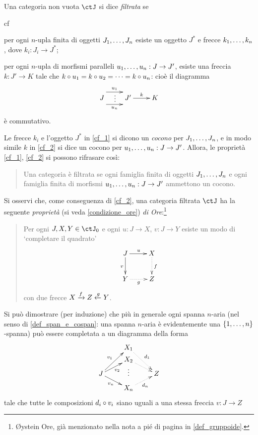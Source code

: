 \begin{definition}\label{def_cat_filtrata}
	Una categoria non vuota \(\ctJ\) si dice \emph{filtrata} se
	\begin{enumtag}{cf}
		\item \label{cf_1} per ogni \(n\)-upla finita di oggetti \(\tup Jn,\) esiste un oggetto \(J^*\) e frecce \(\tup kn,\), dove \(k_i : J_i\to J^*\);
		\item \label{cf_2} per ogni \(n\)-upla di morfismi paralleli \(\tup un, : J\to J'\), esiste una freccia \(k : J'\to K\) tale che \(k\circ u_1 = k\circ u_2 = \dots = k \circ u_n\): cioè il diagramma
		\[\xymatrix{
			J \ar@<.75pc>[r]^-{u_1} \ar@{}@<.2pc>[r]|\vdots\ar@<-.75pc>[r]_-{u_n} & J' \ar[r]^-k & K
			}\]
		è commutativo.
	\end{enumtag}
	Le frecce \(k_i\) e l'oggetto \(J^*\) in \ref{cf_1} si dicono un \emph{cocono} per \(\tup Jn,\), e in modo simile \(k\) in \ref{cf_2} si dice un cocono per \(\tup un, : J\to J'\). Allora, le proprietà \ref{cf_1}, \ref{cf_2} si possono rifrasare così:
	\begin{quote}
		Una categoria è filtrata se ogni famiglia finita di oggetti \(\tup Jn,\) e ogni famiglia finita di morfismi \(\tup un, : J\to J'\) ammettono un cocono.
	\end{quote}
	Si osservi che, come conseguenza di \ref{cf_2}, una categoria filtrata \(\ctJ\) ha la seguente \emph{proprietà} (si veda \ref{condizione_ore}) \emph{di Ore}:\footnote{Øystein Ore, già menzionato nella nota a pié di pagina in \ref{def_gruppoide}.}
	\begin{quote}
		Per ogni \(J,X,Y\in\ctJ_0\) e ogni \(u : J\to X\), \(v : J\to Y\) esiste un modo di `completare il quadrato'
		\[\xymatrix{
				J\ar[r]^u\ar[d]_v & X \ar@{.>}[d]^{f}\\
				Y \ar@{.>}[r]_{g} & Z
			}\]
		con due frecce \(X \xrightarrow{f}Z \xleftarrow{g} Y\).
	\end{quote}
\end{definition}
Si può dimostrare (per induzione) che più in generale ogni spanna \(n\)-aria (nel senso di \ref{def_span_e_cospan}: una spanna \(n\)-aria è evidentemente una \(\{\iter n\}\)-spanna) può essere completata a un diagramma della forma
\[\xymatrix@R=1mm{
	& X_1\ar@{.>}[ddr]^{d_1}\\
	& X_2\ar@{.>}[dr]\\
	J \ar[uur]^-{v_1}\ar[ur]_{v_2}\ar[dr]_-{v_n} & \vdots & Z\\
	& X_n\ar@{.>}[ur]_{d_n}
	}\]
tale che tutte le composizioni \(d_i\circ v_i\) siano uguali a una stessa freccia \(v : J\to Z\)
